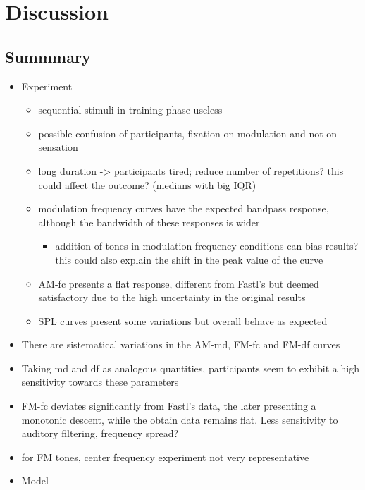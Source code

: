 \documentclass[../main.tex]{subfiles}
\begin{document}
\chapter{Discussion}

\iffalse

\section{Summmary}

\begin{itemize}
  \item Experiment
  \begin{itemize}
    \item sequential stimuli in training phase useless
    \item possible confusion of participants, fixation on modulation and not
      on sensation
    \item long duration -> participants tired; reduce number of repetitions?
      this could affect the outcome? (medians with big IQR)
    \item modulation frequency curves have the expected bandpass response,
      although the bandwidth of these responses is wider
    \begin{itemize}
      \item addition of tones in modulation frequency conditions can bias
        results? this could also explain the shift in the peak value of the
        curve
    \end{itemize}
    \item AM-fc presents a flat response, different from Fastl's but deemed
      satisfactory due to the high uncertainty in the original results
    \item SPL curves present some variations but overall behave as expected
   \end{itemize}
    \item There are sistematical variations in the AM-md, FM-fc and FM-df curves
    \item Taking md and df as analogous quantities, participants seem to exhibit
      a high sensitivity towards these parameters
    \item FM-fc deviates significantly from Fastl's data, the later presenting
      a monotonic descent, while the obtain data remains flat. Less sensitivity
      to auditory filtering, frequency spread?
    \item for FM tones, center frequency experiment not very representative
  \item Model


\end{itemize}
\end{document}
